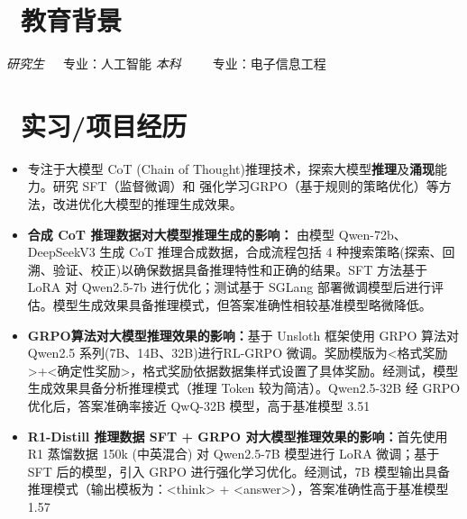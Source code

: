 \documentclass{resume}
\begin{document}


 
\section{\faGraduationCap\  教育背景}
\textit{研究生　}\ 专业：人工智能
\textit{本科　　}\  专业：电子信息工程

\section{\faUsers\ 实习/项目经历}
\role{AI部：NLP算法实习生}
\datedsubsection{\textbf{工作内容}}
\begin{itemize}[itemsep=1ex, topsep=1ex, parsep=0.5ex, leftmargin=1em]
  \item 专注于大模型 CoT (Chain of Thought)推理技术，探索大模型\textbf{推理}及\textbf{涌现}能力。研究 SFT（监督微调）和 强化学习GRPO（基于规则的策略优化）等方法，改进优化大模型的推理生成效果。
    \item \textbf{合成 CoT 推理数据对大模型推理生成的影响：}
  {\linespread{1.2}\selectfont
  由模型 Qwen-72b、DeepSeekV3 生成 CoT 推理合成数据，合成流程包括 4 种搜索策略(探索、回溯、验证、校正)以确保数据具备推理特性和正确的结果。SFT 方法基于 LoRA 对 Qwen2.5-7b 进行优化；测试基于 SGLang 部署微调模型后进行评估。模型生成效果具备推理模式，但答案准确性相较基准模型略微降低。
  }
  \item \textbf{GRPO算法对大模型推理效果的影响：}基于 Unsloth 框架使用 GRPO 算法对 Qwen2.5 系列(7B、14B、32B)进行RL-GRPO 微调。奖励模版为<格式奖励>+<确定性奖励>，格式奖励依据数据集样式设置了具体奖励。经测试，模型生成效果具备分析推理模式（推理 Token 较为简洁）。Qwen2.5-32B 经 GRPO 优化后，答案准确率接近 QwQ-32B 模型，高于基准模型 3.51%
  \item \textbf{R1-Distill 推理数据 SFT + GRPO 对大模型推理效果的影响：}首先使用 R1 蒸馏数据 150k (中英混合) 对 Qwen2.5-7B 模型进行 LoRA 微调；基于 SFT 后的模型，引入 GRPO 进行强化学习优化。经测试，7B 模型输出具备推理模式（输出模板为：<think> + <answer>），答案准确性高于基准模型 1.57%

\end{itemize}
\end{document}

